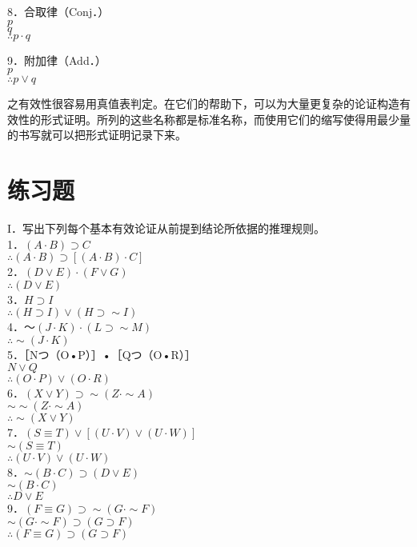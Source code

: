 8．合取律（Conj．）\\
$p$\\
$q$\\
$\therefore p \cdot q$

9．附加律（Add．）\\
$p$\\
$\therefore p \vee q$

之有效性很容易用真值表判定。在它们的帮助下，可以为大量更复杂的论证构造有效性的形式证明。所列的这些名称都是标准名称，而使用它们的缩写使得用最少量的书写就可以把形式证明记录下来。

\section*{练习题}
I．写出下列每个基本有效论证从前提到结论所依据的推理规则。\\
1．$(A \cdot B) \supset C$\\
$\therefore(A \cdot B) \supset[(A \cdot B) \cdot C]$\\
2．$(D \vee E) \cdot(F \vee G)$\\
$\therefore(D \vee E)$\\
3．$H \supset I$\\
$\therefore(H \supset I) \vee(H \supset \sim I)$\\
4．～$(J \cdot K) \cdot(L \supset \sim M)$\\
$\therefore \sim(J \cdot K)$\\
5．［Nつ（O•P）］•［Qつ（O•R）］\\
$N \vee Q$\\
$\therefore(O \cdot P) \vee(O \cdot R)$\\
6．$(X \vee Y) \supset \sim(Z \cdot \sim A)$\\
$\sim \sim(Z \cdot \sim A)$\\
$\therefore \sim(X \vee Y)$\\
7．$(S \equiv T) \vee[(U \cdot V) \vee(U \cdot W)]$\\
$\sim(S \equiv T)$\\
$\therefore(U \cdot V) \vee(U \cdot W)$\\
8．$\sim(B \cdot C) \supset(D \vee E)$\\
$\sim(B \cdot C)$\\
$\therefore D \vee E$\\
9．$(F \equiv G) \supset \sim(G \cdot \sim F)$\\
$\sim(G \cdot \sim F) \supset(G \supset F)$\\
$\therefore(F \equiv G) \supset(G \supset F)$\\
